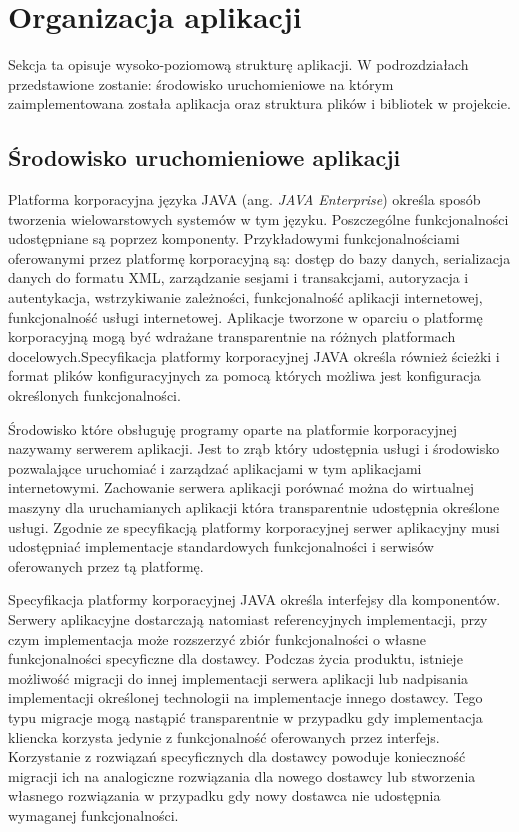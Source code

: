 \section{Organizacja aplikacji}
Sekcja ta opisuje wysoko-poziomową strukturę aplikacji. W podrozdziałach przedstawione zostanie: środowisko uruchomieniowe na którym zaimplementowana została aplikacja oraz struktura plików i bibliotek w projekcie.
\subsection{Środowisko uruchomieniowe aplikacji}
Platforma korporacyjna języka JAVA (ang. \textit{JAVA Enterprise}) określa sposób tworzenia wielowarstowych systemów w tym języku. Poszczególne funkcjonalności udostępniane są poprzez komponenty.  Przykładowymi funkcjonalnościami oferowanymi przez platformę korporacyjną są: dostęp do bazy danych, serializacja danych do formatu XML, zarządzanie sesjami i transakcjami, autoryzacja i autentykacja, wstrzykiwanie zależności, funkcjonalność aplikacji internetowej, funkcjonalność usługi internetowej. Aplikacje tworzone w oparciu o platformę korporacyjną mogą być wdrażane transparentnie na różnych platformach docelowych.Specyfikacja platformy korporacyjnej JAVA określa również ścieżki i format plików konfiguracyjnych za pomocą których możliwa jest konfiguracja określonych funkcjonalności.

Środowisko które obsługuję programy oparte na platformie korporacyjnej nazywamy serwerem aplikacji. Jest to zrąb który udostępnia usługi i środowisko pozwalające uruchomiać i zarządzać aplikacjami w tym aplikacjami internetowymi. Zachowanie serwera aplikacji porównać można do wirtualnej maszyny dla uruchamianych aplikacji która transparentnie udostępnia określone usługi. Zgodnie ze specyfikacją platformy korporacyjnej serwer aplikacyjny musi udostępniać implementacje standardowych funkcjonalności i serwisów oferowanych przez tą platformę. 

Specyfikacja platformy korporacyjnej JAVA określa interfejsy dla komponentów. Serwery aplikacyjne dostarczają natomiast referencyjnych implementacji, przy czym implementacja może rozszerzyć zbiór funkcjonalności o własne funkcjonalności specyficzne dla dostawcy. Podczas życia produktu, istnieje możliwość migracji do innej implementacji serwera aplikacji lub nadpisania implementacji określonej technologii na implementacje innego dostawcy. Tego typu migracje mogą nastąpić transparentnie w przypadku gdy implementacja kliencka korzysta jedynie z funkcjonalność oferowanych przez interfejs. Korzystanie z rozwiązań specyficznych dla dostawcy powoduje konieczność migracji ich na analogiczne rozwiązania dla nowego dostawcy lub stworzenia własnego rozwiązania w przypadku gdy nowy dostawca nie udostępnia wymaganej funkcjonalności.

